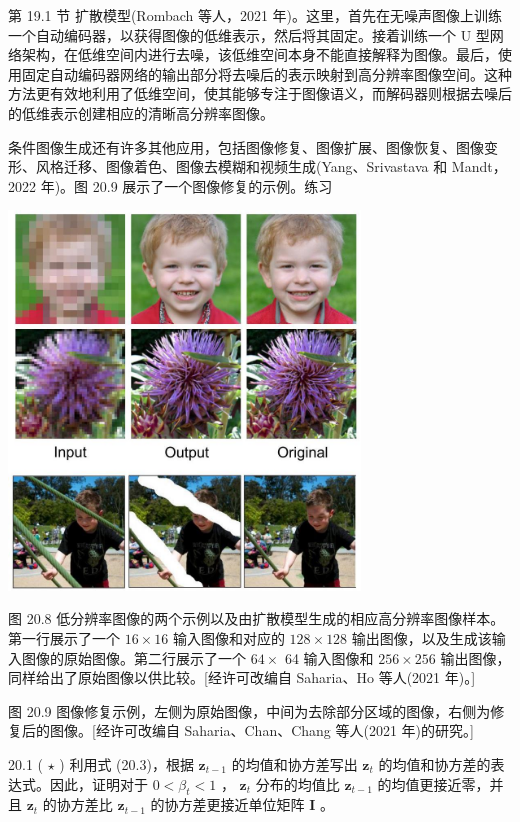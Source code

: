 \documentclass[10pt]{article}
\begin{document}
第 19.1 节 扩散模型(Rombach 等人，2021 年)。这里，首先在无噪声图像上训练一个自动编码器，以获得图像的低维表示，然后将其固定。接着训练一个 U 型网络架构，在低维空间内进行去噪，该低维空间本身不能直接解释为图像。最后，使用固定自动编码器网络的输出部分将去噪后的表示映射到高分辨率图像空间。这种方法更有效地利用了低维空间，使其能够专注于图像语义，而解码器则根据去噪后的低维表示创建相应的清晰高分辨率图像。

条件图像生成还有许多其他应用，包括图像修复、图像扩展、图像恢复、图像变形、风格迁移、图像着色、图像去模糊和视频生成(Yang、Srivastava 和 Mandt，2022 年)。图 20.9 展示了一个图像修复的示例。练习

\begin{center}
\includegraphics[max width=0.7\textwidth]{images/0194e279-9b28-703a-88f4-c3ac21e2010d_622_688_348_868_936_0.jpg}
\end{center}
\hspace*{3em} 

图 20.8 低分辨率图像的两个示例以及由扩散模型生成的相应高分辨率图像样本。第一行展示了一个 \({16} \times  {16}\) 输入图像和对应的 \({128} \times  {128}\) 输出图像，以及生成该输入图像的原始图像。第二行展示了一个 \({64} \times\) 64 输入图像和 \({256} \times  {256}\) 输出图像，同样给出了原始图像以供比较。[经许可改编自 Saharia、Ho 等人(2021 年)。]

图 20.9 图像修复示例，左侧为原始图像，中间为去除部分区域的图像，右侧为修复后的图像。[经许可改编自 Saharia、Chan、Chang 等人(2021 年)的研究。]

20.1 ( \(\star\) ) 利用式 (20.3)，根据 \({\mathbf{z}}_{t - 1}\) 的均值和协方差写出 \({\mathbf{z}}_{t}\) 的均值和协方差的表达式。因此，证明对于 \(0 < {\beta }_{t} < 1\) ， \({\mathbf{z}}_{t}\) 分布的均值比 \({\mathbf{z}}_{t - 1}\) 的均值更接近零，并且 \({\mathbf{z}}_{t}\) 的协方差比 \({\mathbf{z}}_{t - 1}\) 的协方差更接近单位矩阵 \(\mathbf{I}\) 。
\end{document}
